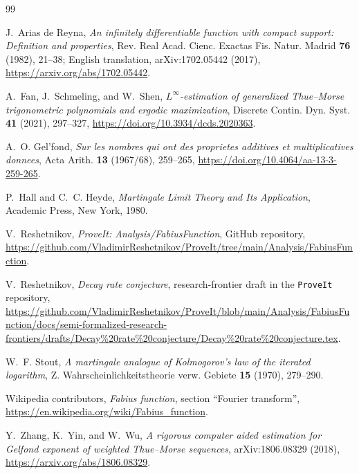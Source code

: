 \documentclass[11pt,oneside]{article}
\theoremstyle{definition}
\theoremstyle{remark}
\begin{document}
\begin{thebibliography}{99}

J.~Arias de Reyna,
\newblock \emph{An infinitely differentiable function with compact support:
Definition and properties},
\newblock Rev. Real Acad. Cienc. Exactas Fis. Natur. Madrid \textbf{76} (1982),
21--38; English translation, arXiv:1702.05442 (2017),
\newblock \url{https://arxiv.org/abs/1702.05442}.

A.~Fan, J.~Schmeling, and W.~Shen,
\newblock \emph{$L^\infty$-estimation of generalized Thue--Morse
trigonometric polynomials and ergodic maximization},
\newblock Discrete Contin. Dyn. Syst. \textbf{41} (2021), 297--327,
\newblock \url{https://doi.org/10.3934/dcds.2020363}.

A.~O. Gel'fond,
\newblock \emph{Sur les nombres qui ont des proprietes additives et
multiplicatives donnees},
\newblock Acta Arith. \textbf{13} (1967/68), 259--265,
\newblock \url{https://doi.org/10.4064/aa-13-3-259-265}.

P.~Hall and C.~C. Heyde,
\newblock \emph{Martingale Limit Theory and Its Application},
\newblock Academic Press, New York, 1980.

V.~Reshetnikov,
\newblock \emph{ProveIt: Analysis/FabiusFunction}, GitHub repository,
\newblock \url{https://github.com/VladimirReshetnikov/ProveIt/tree/main/Analysis/FabiusFunction}.

V.~Reshetnikov,
\newblock \emph{Decay rate conjecture}, research-frontier draft in the
\texttt{ProveIt} repository,
\newblock \url{https://github.com/VladimirReshetnikov/ProveIt/blob/main/Analysis/FabiusFunction/docs/semi-formalized-research-frontiers/drafts/Decay%20rate%20conjecture/Decay%20rate%20conjecture.tex}.

W.~F. Stout,
\newblock \emph{A martingale analogue of Kolmogorov's law of the iterated
logarithm},
\newblock Z. Wahrscheinlichkeitstheorie verw. Gebiete \textbf{15} (1970),
279--290.

Wikipedia contributors,
\newblock \emph{Fabius function}, section ``Fourier transform'',
\newblock \url{https://en.wikipedia.org/wiki/Fabius_function}.

Y.~Zhang, K.~Yin, and W.~Wu,
\newblock \emph{A rigorous computer aided estimation for Gelfond exponent of
weighted Thue--Morse sequences},
\newblock arXiv:1806.08329 (2018),
\newblock \url{https://arxiv.org/abs/1806.08329}.

\end{thebibliography}
\end{document}
